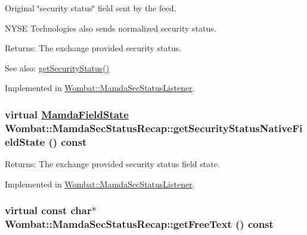 Original \char`\"{}security status\char`\"{} field sent by the feed. 

NYSE Technologies also sends normalized security status.

\begin{Desc}
\item[Returns:]The exchange provided security status. \end{Desc}
\begin{Desc}
\item[See also:]\hyperlink{classWombat_1_1MamdaSecStatusRecap_d7bd3380fa057d4de729bff89d649b57}{get\-Security\-Status()} \end{Desc}


Implemented in \hyperlink{classWombat_1_1MamdaSecStatusListener_9f8513907a453b1f2e5b7fad4f6c8b01}{Wombat::Mamda\-Sec\-Status\-Listener}.\hypertarget{classWombat_1_1MamdaSecStatusRecap_18ac6dd6bffc701f7a2055d97d001fae}{
\subsubsection[getSecurityStatusNativeFieldState]{\setlength{\rightskip}{0pt plus 5cm}virtual \hyperlink{namespaceWombat_93aac974f2ab713554fd12a1fa3b7d2a}{Mamda\-Field\-State} Wombat::Mamda\-Sec\-Status\-Recap::get\-Security\-Status\-Native\-Field\-State () const}}
\label{classWombat_1_1MamdaSecStatusRecap_18ac6dd6bffc701f7a2055d97d001fae}


\begin{Desc}
\item[Returns:]The exchange provided security status field state. \end{Desc}


Implemented in \hyperlink{classWombat_1_1MamdaSecStatusListener_6ceb039c9b33e50e458383e108670f67}{Wombat::Mamda\-Sec\-Status\-Listener}.\hypertarget{classWombat_1_1MamdaSecStatusRecap_0c7ed2aa4c43501c34fd671bf4a860e6}{
\subsubsection[getFreeText]{\setlength{\rightskip}{0pt plus 5cm}virtual const char$\ast$ Wombat::Mamda\-Sec\-Status\-Recap::get\-Free\-Text () const}}
\label{classWombat_1_1MamdaSecStatusRecap_0c7ed2aa4c43501c34fd671bf4a860e6}


